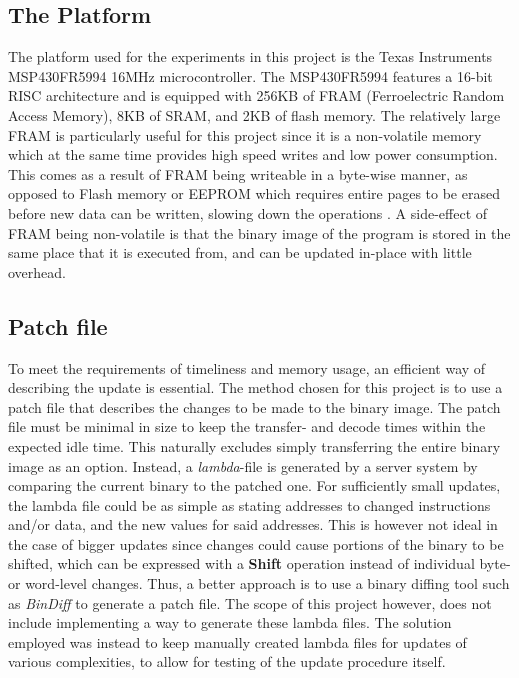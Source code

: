 \subsection{The Platform}\label{sec:platform}
The platform used for the experiments in this project is the Texas Instruments MSP430FR5994 16MHz microcontroller. The MSP430FR5994 features a 16-bit RISC architecture and is equipped with 256KB of FRAM (Ferroelectric Random Access Memory), 8KB of SRAM, and 2KB of flash memory. The relatively large FRAM is particularly useful for this project since it is a non-volatile memory which at the same time provides high speed writes and low power consumption. This comes as a result of FRAM being writeable in a byte-wise manner, as opposed to Flash memory or EEPROM which requires entire pages to be erased before new data can be written, slowing down the operations \cite{framReport}. A side-effect of FRAM being non-volatile is that the binary image of the program is stored in the same place that it is executed from, and can be updated in-place with little overhead. 

\subsection{Patch file}\label{sec:patchfile}
To meet the requirements of timeliness and memory usage, an efficient way of describing the update is essential. The method chosen for this project is to use a patch file that describes the changes to be made to the binary image.
The patch file must be minimal in size to keep the transfer- and decode times within the expected idle time. This naturally excludes simply transferring the entire binary image as an option. Instead, a \textit{lambda}-file is generated by a server system by comparing the current binary to the patched one. For sufficiently small updates, the lambda file could be as simple as stating addresses to changed instructions and/or data, and the new values for said addresses. This is however not ideal in the case of bigger updates since changes could cause portions of the binary to be shifted, which can be expressed with a \textbf{Shift} operation instead of individual byte- or word-level changes. Thus, a better approach is to use a binary diffing tool such as \textit{BinDiff} to generate a patch file. The scope of this project however, does not include implementing a way to generate these lambda files. The solution employed was instead to keep manually created lambda files for updates of various complexities, to allow for testing of the update procedure itself. 

